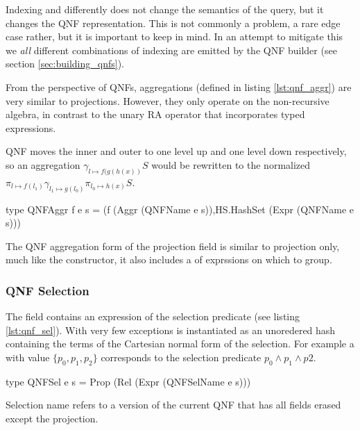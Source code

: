 Indexing  and  differently does not change the
semantics of the query, but it changes the QNF representation. This is
not commonly a problem, a rare edge case rather, but it is important to keep in mind.
In an attempt to mitigate this we \emph{all} different combinations of indexing are emitted by the
QNF builder (see section \ref{sec:building_qnfs}).

From the perspective of QNFs,  aggregations (defined in listing \ref{lst:qnf_aggr}) 
are very similar to projections. However, they only operate on the non-recursive
 algebra, in contrast to the  unary RA operator that incorporates
 typed expressions. 

QNF moves the inner and outer  to one level up and
one level down respectively, so an aggregation \(\gamma_{l \mapsto f(g(h(x))} S\) would be
rewritten to the normalized
\(\pi_{l \mapsto f(l_1)} \gamma_{l_1 \mapsto g(l_0)} \pi_{l_0 \mapsto h(x)} S\).

\begin{code}
  \begin{haskellcode}
    type QNFAggr f e s =
    (f (Aggr (QNFName e s)),HS.HashSet (Expr (QNFName e s)))
  \end{haskellcode}
  \label{lst:qnf_aggr}
  \caption{The QNF aggregation form of the projection field is similar
    to projection only, much like the  constructor, it
    also includes a  of exprssions on which to group.}
\end{code}

\subsubsection{QNF Selection}

The  field contains an expression
of the selection predicate (see listing \ref{lst:qnf_sel}). With very few
exceptions  is instantiated as an unoredered hash containing the
terms of the Cartesian normal form of the selection. For example a 
with value \(\{p_0, p_1, p_2\}\) corresponds to the selection predicate
\(p_0 \land p_1 \land p2\).

\begin{code}
  \begin{haskellcode}
    type QNFSel e s = Prop (Rel (Expr (QNFSelName e s)))
  \end{haskellcode}
  \caption{\label{lst:qnf_sel}Selection name refers to a version of
    the current QNF that has all fields erased except the projection.}
\end{code}


